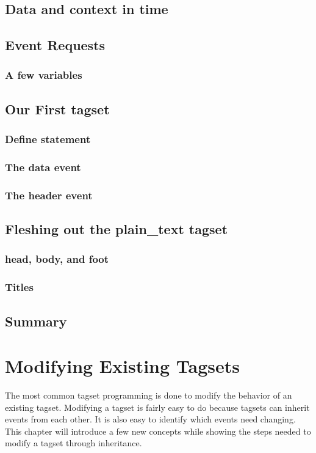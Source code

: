\documentclass{book}
\begin{document}
\section{Data and context in time}

\section{Event Requests}

\subsection{A few variables}

\section{Our First tagset}

\subsection{Define statement}

\subsection{The data event}

\subsection{The header event}

\section{Fleshing out the plain\_text tagset}

\subsection{head, body, and foot}

\subsection{Titles}

\section{Summary}

\chapter{Modifying Existing Tagsets}
The most common tagset programming is done to
modify the behavior of an existing tagset. 
Modifying a tagset is fairly easy to do because
tagsets can inherit events from each other.  
It is also easy to identify which events need changing.
This chapter will introduce a few new concepts
while showing the steps needed to modify a tagset
through inheritance.  
\end{document}
